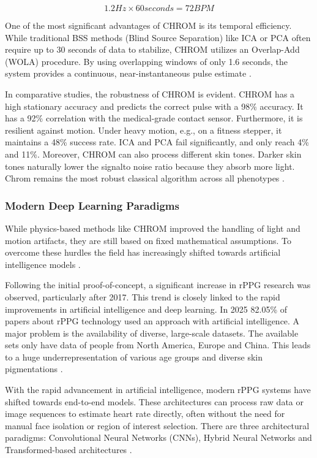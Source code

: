$$1.2 Hz \times 60 seconds = 72 BPM$$

One of the most significant advantages of CHROM is its temporal efficiency. While traditional BSS methods (Blind Source Separation) like ICA or PCA often require up to 30 seconds of data to stabilize, CHROM utilizes an Overlap-Add (WOLA) procedure. By using overlapping windows of only 1.6 seconds, the system provides a continuous, near-instantaneous pulse estimate \cite{dehaan2013chrom}.

In comparative studies, the robustness of CHROM is evident. CHROM has a high stationary accuracy and predicts the correct pulse with a 98\% accuracy. It has a 92\% correlation with the medical-grade contact sensor. Furthermore, it is resilient against motion. Under heavy motion, e.g., on a fitness stepper, it maintains a 48\% success rate. ICA and PCA fail significantly, and only reach 4\% and 11\%. Moreover, CHROM can also process different skin tones. Darker skin tones naturally lower the signalto noise ratio because they absorb more light. Chrom remains the most robust classical algorithm across all phenotypes \cite{dehaan2013chrom}.

\subsubsection{Modern Deep Learning Paradigms}

While physics-based methods like CHROM improved the handling of light and motion artifacts, they are still based on fixed mathematical assumptions. To overcome these hurdles the field has increasingly shifted towards artificial intelligence models \cite{Debnath25}.

Following the initial proof-of-concept, a significant increase in rPPG research was observed, particularly after 2017. This trend is closely linked to the rapid improvements in artificial intelligence and deep learning. In 2025 82.05\% \cite{Debnath25} of papers about rPPG technology used an approach with artificial intelligence. A major problem is the availability of diverse, large-scale datasets. The available sets only have data of people from North America, Europe and China. This leads to a huge underrepresentation of various age groups and diverse skin pigmentations \cite{Debnath25}.

With the rapid advancement in artificial intelligence, modern rPPG systems have shifted towards end-to-end models. These architectures can process raw data or image sequences to estimate heart rate directly, often without the need for manual face isolation or region of interest  selection. There are three architectural paradigms: Convolutional Neural Networks (CNNs), Hybrid Neural Networks and Transformed-based architectures \cite{Debnath25}.

